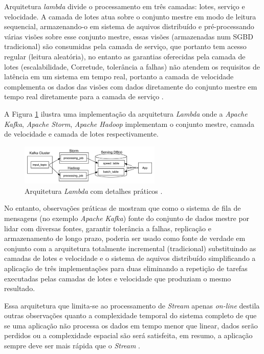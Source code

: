 Arquitetura \emph{lambda} divide o processamento em três camadas: lotes, serviço
e velocidade. A camada de lotes atua sobre o conjunto mestre em modo de leitura
sequencial, armazenando-o em sistema de aquivos distribuído e pré-processando
várias visões sobre esse conjunto mestre, essas visões (armazenadas num SGBD
tradicional) são consumidas pela camada de serviço, que portanto tem acesso
regular (leitura aleatória), no entanto as garantias oferecidas pela camada de
lotes (escalabilidade, Corretude, tolerância a falhas) não atendem os requisitos
de latência em um sistema em tempo real, portanto a camada de velocidade
complementa os dados das visões com dados diretamente do conjunto mestre em
tempo real diretamente para a camada de serviço \cite{marz2015big}.

A Figura \ref{lambda} ilustra uma implementação da arquitetura \emph{Lambda}
onde a \emph{Apache Kafka}, \emph{Apache Storm}, \emph{Apache Hadoop}
implementam o conjunto mestre, camada de velocidade e camada de lotes
respectivamente.

\begin{figure}[ht]
\centering
\includegraphics[width=0.6\textwidth]{figuras/lambda.png}
\caption{Arquitetura \emph{Lambda} com detalhes práticos \cite{Kreps2014}.}
\label{lambda}
\end{figure}

No entanto, observações práticas de  mostram que como o
sistema de fila de mensagens (no exemplo \emph{Apache Kafka}) fonte do conjunto
de dados mestre por lidar com diversas fontes, garantir tolerância a falhas,
replicação e armazenamento de longo prazo, poderia ser usado como fonte de
verdade em conjunto com a arquitetura totalmente incremental (tradicional)
substituindo as camadas de lotes e velocidade e o sistema de aquivos distribuído
simplificando a aplicação de três implementações para duas eliminando a
repetição de tarefas executadas pelas camadas de lotes e velocidade que
produziam o mesmo resultado.

Essa arquitetura que limita-se ao processamento de \emph{Stream} apenas
\emph{on-line} destila outras observações quanto a complexidade temporal do
sistema completo de que se uma aplicação não processa os dados em tempo menor
que linear, dados serão perdidos ou a complexidade espacial são será satisfeita,
em resumo, a aplicação sempre deve ser mais rápida que o \emph{Stream}
\cite{marz2015big}.

